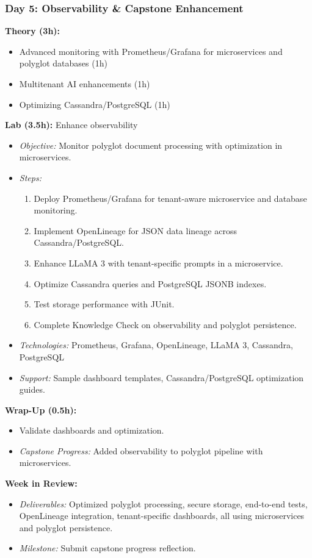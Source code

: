 \documentclass[11pt]{article}
\begin{document}
\subsubsection{Day 5: Observability \& Capstone Enhancement}
\textbf{Theory (3h):}
\begin{itemize}
    \item Advanced monitoring with Prometheus/Grafana for microservices and polyglot databases (1h)
    \item Multitenant AI enhancements (1h)
    \item Optimizing Cassandra/PostgreSQL (1h)
\end{itemize}
\textbf{Lab (3.5h):} Enhance observability
\begin{itemize}
    \item \textit{Objective:} Monitor polyglot document processing with optimization in microservices.
    \item \textit{Steps:}
        \begin{enumerate}
            \item Deploy Prometheus/Grafana for tenant-aware microservice and database monitoring.
            \item Implement OpenLineage for JSON data lineage across Cassandra/PostgreSQL.
            \item Enhance LLaMA 3 with tenant-specific prompts in a microservice.
            \item Optimize Cassandra queries and PostgreSQL JSONB indexes.
            \item Test storage performance with JUnit.
            \item Complete Knowledge Check on observability and polyglot persistence.
        \end{enumerate}
    \item \textit{Technologies:} Prometheus, Grafana, OpenLineage, LLaMA 3, Cassandra, PostgreSQL
    \item \textit{Support:} Sample dashboard templates, Cassandra/PostgreSQL optimization guides.
\end{itemize}
\textbf{Wrap-Up (0.5h):}
\begin{itemize}
    \item Validate dashboards and optimization.
    \item \textit{Capstone Progress:} Added observability to polyglot pipeline with microservices.
\end{itemize}

\textbf{Week in Review:}
\begin{itemize}
    \item \textit{Deliverables:} Optimized polyglot processing, secure storage, end-to-end tests, OpenLineage integration, tenant-specific dashboards, all using microservices and polyglot persistence.
    \item \textit{Milestone:} Submit capstone progress reflection.
\end{itemize}
\end{document}

